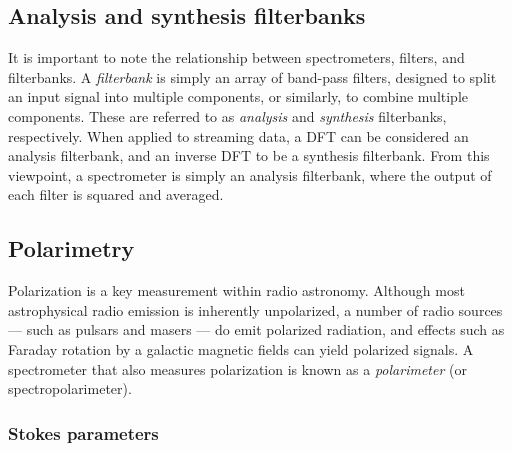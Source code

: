 \documentclass{ws-rv961x669}
\begin{document}
\subsection{Analysis and synthesis filterbanks}

It is important to note the relationship between spectrometers, filters, and filterbanks. A \emph{filterbank} is simply an array of band-pass filters, designed to split an input signal into multiple components, or similarly, to combine multiple components. These are referred to as \emph{analysis} and \emph{synthesis} filterbanks, respectively. When applied to streaming data, a DFT can be considered an analysis filterbank, and an inverse DFT to be a synthesis filterbank. From this viewpoint, a spectrometer is simply an analysis filterbank, where the output of each filter is squared and averaged.


\subsection{Polarimetry}

Polarization is a key measurement within radio astronomy.\citet{BookTinbergenPolarim}  Although most astrophysical radio emission is inherently unpolarized, a number of radio sources --- such as pulsars and masers --- do emit polarized radiation, and effects such as Faraday rotation by a galactic magnetic fields can yield polarized signals. A spectrometer that also measures polarization is known as a \emph{polarimeter} (or spectropolarimeter).

\subsubsection{Stokes parameters}
\end{document}
